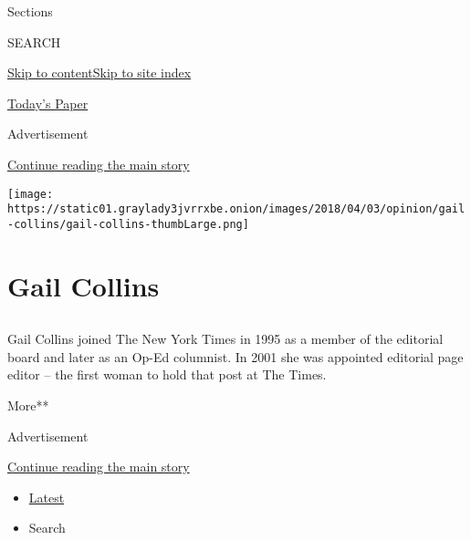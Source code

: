Sections

SEARCH

\protect\hyperlink{site-content}{Skip to
content}\protect\hyperlink{site-index}{Skip to site index}

\href{https://myaccount.nytimes3xbfgragh.onion/auth/login?response_type=cookie\&client_id=vi}{}

\href{https://www.nytimes3xbfgragh.onion/section/todayspaper}{Today's
Paper}

Advertisement

\protect\hyperlink{after-top}{Continue reading the main story}

\texttt{[image: https://static01.graylady3jvrrxbe.onion/images/2018/04/03/opinion/gail-collins/gail-collins-thumbLarge.png]}

\hypertarget{gail-collins}{%
\section{Gail Collins}\label{gail-collins}}

\subsection{}

Gail Collins joined The New York Times in 1995 as a member of the
editorial board and later as an Op-Ed columnist. In 2001 she was
appointed editorial page editor -- the first woman to hold that post at
The Times.

More**

Advertisement

\protect\hyperlink{after-mid1}{Continue reading the main story}

\begin{itemize}
\tightlist
\item
  \protect\hyperlink{stream-panel}{Latest}
\item
  Search
\end{itemize}

